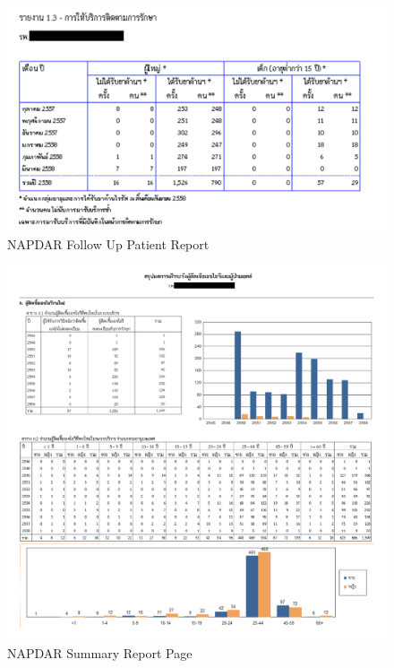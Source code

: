 
\FloatBarrier
	\begin{figure}[h!]
        \centering
    		\includegraphics[width=12cm]{images/chapter-01/napdar-05.png}
    		\caption{NAPDAR Follow Up Patient Report}
    \end{figure}
\FloatBarrier



\FloatBarrier
	\begin{figure}[h!]
        \centering
    		\includegraphics[width=\linewidth]{images/chapter-01/napdar-08.png}
    		\caption{NAPDAR Summary Report Page}
    \end{figure}
\FloatBarrier